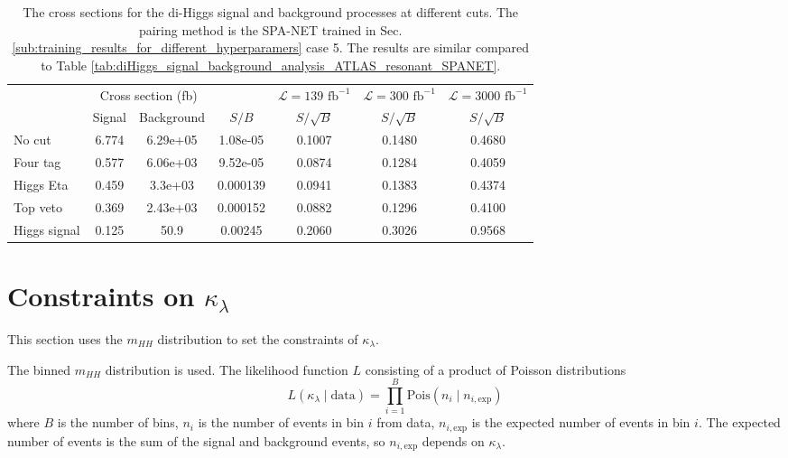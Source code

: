 \documentclass[12pt]{article}
\begin{document}
		\begin{table}[htpb]
			\centering
			\caption{The cross sections for the di-Higgs signal and background processes at different cuts. The pairing method is the SPA-NET trained in Sec.\ref{sub:training_results_for_different_hyperparamers} case 5. The results are similar compared to Table \ref{tab:diHiggs_signal_background_analysis_ATLAS_resonant_SPANET}.}
			\label{tab:diHiggs_signal_background_analysis_ATLAS_best_hp_SPANET_5}
			\begin{tabular}{l|cc|c|c|c|c}
							 & \multicolumn{2}{c|}{Cross section (fb)} &          & $\mathcal{L} = 139 \text{ fb}^{-1}$ & $\mathcal{L} = 300 \text{ fb}^{-1}$ & $\mathcal{L} = 3000 \text{ fb}^{-1}$ \\
							 & Signal           & Background           & $S / B$  & $S/\sqrt{B}$                        & $S/\sqrt{B}$                        & $S/\sqrt{B}$                         \\ \hline
				No cut       & 6.774 & 6.29e+05 & 1.08e-05 & 0.1007 & 0.1480 & 0.4680 \\
				Four tag     & 0.577 & 6.06e+03 & 9.52e-05 & 0.0874 & 0.1284 & 0.4059 \\
				Higgs Eta    & 0.459 & 3.3e+03  & 0.000139 & 0.0941 & 0.1383 & 0.4374 \\
				Top veto     & 0.369 & 2.43e+03 & 0.000152 & 0.0882 & 0.1296 & 0.4100 \\
				Higgs signal & 0.125 & 50.9     & 0.00245  & 0.2060 & 0.3026 & 0.9568
			\end{tabular}
		\end{table}
\section{Constraints on \texorpdfstring{$\kappa_\lambda$}{kappa}}%
\label{sec:constraints_on_kappa}
	This section uses the $m_{HH}$ distribution to set the constraints of $\kappa_\lambda$.

	The binned $m_{HH}$ distribution is used. The likelihood function $L$ consisting of a product of Poisson distributions 
	\begin{equation}
		L(\kappa_\lambda \mid \text{data}) = \prod_{i=1}^{B} \text{Pois}(n_i\mid n_{i,\text{exp}})
	\end{equation}
	where $B$ is the number of bins, $n_i$ is the number of events in bin $i$ from data, $n_{i,\text{exp}}$ is the expected number of events in bin $i$. The expected number of events is the sum of the signal and background events, so $n_{i,\text{exp}}$ depends on $\kappa_\lambda$.
\end{document}
